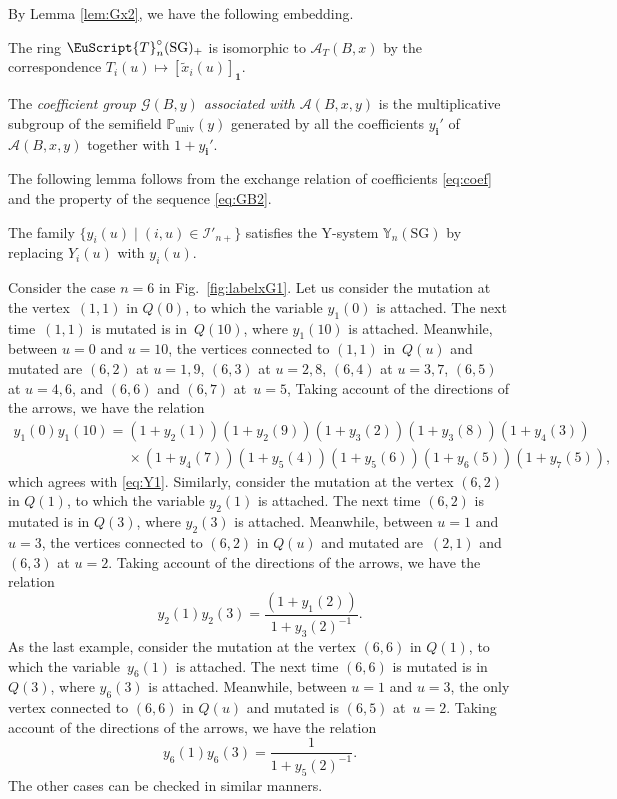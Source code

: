 By Lemma \ref{lem:Gx2}, we have the following embedding.
\begin{Theorem}
\label{thm:GTiso}
The ring $\EuScript{T}^{\circ}_{n}(\mathrm{SG})_+$ is isomorphic to
$\mathcal{A}_T(B,x)$ by the correspondence
$T_i(u)\mapsto [\tilde{x}_i(u)]_{\mathbf{1}}$.
\end{Theorem}



The {\em coefficient group $\mathcal{G}(B,y)$
associated with $\mathcal{A}(B,x,y)$}
is the multiplicative subgroup of
the semif\/ield $\mathbb{P}_{\mathrm{univ}}(y)$ generated by all
the coef\/f\/icients $y_{\mathbf{i}}'$ of $\mathcal{A}(B,x,y)$
together with $1+y_{\mathbf{i}}'$.

The following lemma follows from the exchange relation of
coef\/f\/icients \eqref{eq:coef} and the property of the sequence
\eqref{eq:GB2}.


\begin{Lemma}
\label{lem:Gy2}
The family $\{ y_i(u)
\mid (i,u)\in \mathcal{I}'_{n+}\}$
satisfies the Y-system $\mathbb{Y}_{n}(\mathrm{SG})$
by replacing $Y_i(u)$ with $y_i(u)$.
\end{Lemma}

\begin{Example}
Consider the case $n=6$ in Fig.~\ref{fig:labelxG1}.
Let us consider the mutation at the vertex~$(1,1)$ in $Q(0)$,
to which  the variable $y_1(0)$ is attached.
The next time~$(1,1)$ is mutated is in~$Q(10)$,
where $y_1(10)$ is attached.
Meanwhile, between $u=0$ and $u=10$,
the vertices connected to $(1,1)$ in~$Q(u)$ and mutated
are
$(6,2)$ at $u=1,9$, $(6,3)$ at $u=2,8$, $(6,4)$ at $u=3,7$,
$(6,5)$ at $u=4,6$, and  $(6,6)$ and $(6,7)$ at~$u=5$,
Taking account of the directions of the arrows,
we have the relation
\begin{gather*}
y_1(0)y_1(10)=
(1+y_2(1))(1+y_2(9))(1+y_3(2))(1+y_3(8)) (1+y_4(3))\\
\phantom{y_1(0)y_1(10)=}{} \times (1+y_4(7))
(1+ y_5(4))(1+y_5(6)) (1+y_6(5))(1+y_7(5)),
\end{gather*}
which agrees with
\eqref{eq:Y1}.
Similarly, consider the mutation at the vertex $(6,2)$ in $Q(1)$,
to which  the variable $y_2(1)$ is attached.
The next time $(6,2)$ is mutated is in $Q(3)$,
where $y_2(3)$ is attached.
Meanwhile, between $u=1$ and $u=3$,
the vertices connected to $(6,2)$ in $Q(u)$ and mutated
are~$(2,1)$ and~$(6,3)$ at $u=2$.
Taking account of the directions of the arrows,
we have the relation
\[
y_2(1)y_2(3) =
\frac{(1+y_1(2))}{1+y_3(2)^{-1}}.
\]
As the last example, consider the mutation at the vertex $(6,6)$ in $Q(1)$,
to which  the variable~$y_6(1)$ is attached.
The next time $(6,6)$ is mutated is in $Q(3)$,
where $y_6(3)$ is attached.
Meanwhile, between $u=1$ and $u=3$,
the only vertex connected to $(6,6)$ in $Q(u)$ and mutated
is  $(6,5)$ at~$u=2$.
Taking account of the directions of the arrows,
we have the relation
\[
y_6(1)y_6(3) =
\frac{1}{1+y_5(2)^{-1}}.
\]
The other cases can be checked in similar manners.
\end{Example}

